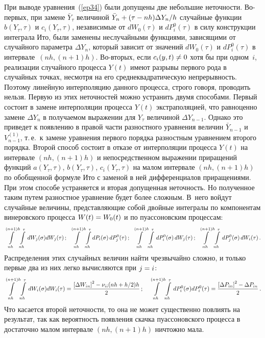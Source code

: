 {При выводе уравнения~(\ref{ep34}) были допущены две небольшие неточности.
Во-пер\-вых, при замене $\bar Y_{\tau}$ величиной $\bar Y_n\hm+(\tau-nh)\Delta Y_n/h$ случайные функции $b(Y_{\tau},\tau)$ и
$c_i(Y_{\tau},\tau )$, независимые от $dW_0(\tau)$ и $dP_i^0(\tau)$
в силу конструкции интеграла Ито, были заменены неслучайными
функциями, зависящими от случайного параметра $\Delta Y_n$, который
зависит от значений $dW_0(\tau)$ и $dP_i^0(\tau)$ в интервале~$(nh,(n+1)h)$. Во-вто\-рых, 
если $c_i(y,t)\hm\ne 0$ хотя бы при одном~$i$, реализации случайного процесса $Y(t)$ имеют разрывы первого
рода в случайных точках, несмотря на его сред\-не\-квад\-ра\-ти\-че\-скую
непрерывность. Поэтому линейную интерполяцию данного процесса,
строго говоря, проводить нельзя. Первую из этих неточностей можно
устранить двумя способами. Первый состоит в замене интерполяции
процесса $Y(t)$ экстраполяцией, что равноценно замене $\Delta Y_n$ в
получаемом выражении для $Y_{\tau}$ величиной $\Delta Y_{n-1}$.
Однако это приведет к появлению в правой части разностного уравнения
величин $\bar Y_{n-1}$ и $V_{n-1}^{(1)}$, т.\,е.\ к замене уравнения
первого порядка разностным уравнением второго порядка. Второй способ
состоит в отказе от интерполяции процесса $Y(t)$ на интервале
$(nh,(n+1)h)$ и непосредственном выражении приращений функций
$a(Y_{\tau},\tau)$, $b(Y_{\tau},\tau)$, $c_i(Y_{\tau},\tau)$ на
малом интервале $(nh,(n+1)h)$ по обобщенной формуле Ито с заменой в
ней дифференциалов приращениями. При этом способе устраняется и
вторая допущенная неточность. Но полученное таким путем разностное
уравнение будет более сложным. В~него войдут случайные величины,
представляющие собой двойные интегралы по компонентам винеровского
процесса $W(t)\hm=W_0(t)$ и по пуассоновским процессам:
    $$
    \inh \int\limits_{nh}^{\tau}\,dW_j(\sigma)dW_j(\tau)\,;
    \enskip  \inh \int\limits_{nh}^{\tau}dP_i(\sigma)\,dP_j^0(\tau)\,;\enskip
    \inh \int\limits_{nh}^{\tau}\,dP_i^0(\sigma)\,dW_j(\tau)\,;
    \enskip  \inh \int\limits_{nh}^{\tau}\,dP_j^0(\sigma)\,dW_i(\tau)\,. %
    $$
Распределения этих случайных величин найти чрезвычайно сложно, и
только первые два из них легко вычисляются при $j\hm=i$:
    $$
    \inh \int\limits_{nh}^{\tau}\,dW_i(\sigma)dW_i(\tau)=
\fr{\left[\Delta W_{in}\right]^2-\nu_{ii}(nh+h/2)h}{2}\,;\quad 
\inh \int\limits_{nh}^{\tau}\,dP_i^0(\sigma)dP_i^0(\tau)=
\fr{\left[\Delta P_{in}\right]^2-\Delta P_{in}}{2}\,. %
$$
Что касается второй неточности, то она не может существенно повлиять
на результат, так как вероятность появления скачка пуассоновского
процесса в достаточно малом интервале $(nh,(n+1)h)$ ничтожно мала.

}
